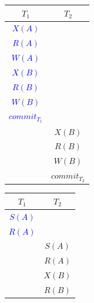 \documentclass{templateNote}
\begin{document}
\begin{itemize}
\begin{itemize}
        \begin{figure}[H]
            \begin{minipage}{0.5\textwidth}
                \centering
                \colorbox{green!20!white}{
                \begin{tabular}{|c|c|}
                    \hline
                    \textbf{$T_1$} & \textbf{$T_2$} \\ \hline
                    \textcolor{blue}{$X(A)$} & \\
                    \textcolor{blue}{$R(A)$} & \\
                    \textcolor{blue}{$W(A)$} & \\
                    \textcolor{blue}{$X(B)$} & \\
                    \textcolor{blue}{$R(B)$} & \\
                    \textcolor{blue}{$W(B)$} & \\
                    \textcolor{blue}{\textit{$commit_{T_1}$}} & \\ \hline
                    & \textcolor{green!80!black}{$X(B)$} \\
                    & \textcolor{green!80!black}{$R(B)$} \\
                    & \textcolor{green!80!black}{$W(B)$} \\
                    & \textcolor{green!80!black}{\textit{$commit_{T_2}$}} \\ \hline
                \end{tabular}
                }
            \end{minipage}
            \hfill
            \begin{minipage}{0.5\textwidth}
                \centering
                \colorbox{green!20!white}{
                \begin{tabular}{|c|c|}
                    \hline
                    \textbf{$T_1$} & \textbf{$T_2$} \\ \hline
                    \textcolor{blue}{$S(A)$} & \\
                    \textcolor{blue}{$R(A)$} & \\
                    & \textcolor{green!80!black}{$S(A)$} \\
                    & \textcolor{green!80!black}{$R(A)$} \\
                    & \textcolor{green!80!black}{$X(B)$} \\
                    & \textcolor{green!80!black}{$R(B)$} \\

\end{tabular}}
\end{minipage}
\end{figure}
\end{itemize}
\end{itemize}
\end{document}
